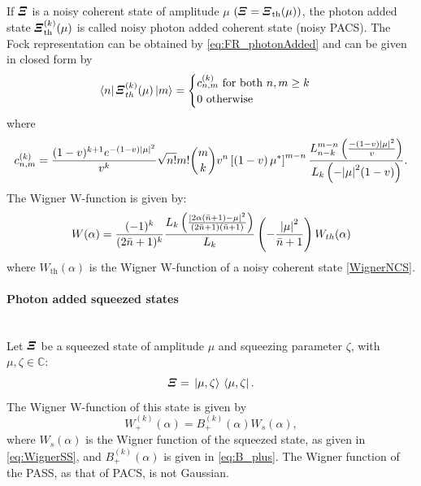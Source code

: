         If $\Operator{\varXi}$ is a noisy coherent state of amplitude $\mu$ 
        $(\Operator{\varXi}=\Operator{\varXi}_{\mathrm{th}}(\mu))$,
        the photon added state $\Operator{\varXi}_{\mathrm{th}}^{(k)}(\mu)$ is called noisy photon added coherent state
        (noisy PACS).
        The Fock representation can be obtained by \ref{eq:FR_photonAdded} and can be given in closed
        form by \cite{PACSDisc}
        \begin{equation}
            \bra{n}\Operator{\varXi}_{th}^{(k)}(\mu)\ket{m}=
            \begin{cases}
                c_{n,m}^{(k)} \mbox{\ for\ both\ } n,m \geq k\\
                0\mbox{\ otherwise}
            \end{cases}
        \end{equation}
        where
        \begin{equation*}
            c_{n,m}^{(k)}=\frac{(1-v)^{k+1}e^{-(1-v)\absolutevalue{\mu}^2}}{v^k}
            \sqrt{n!}{m!}\binom{m}{k} v^n \left[\left(1-v\right)\mu^*\right]^{m-n}
            \frac{L^{m-n}_{n-k} \left( \frac{-(1-v)\absolutevalue{\mu}^2}{v} \right)}
            {L_k \left( -\absolutevalue{\mu}^2 (1-v) \right)}.
        \end{equation*}
        The Wigner W-function is given by:
        \begin{equation}
            W(\alpha)=\frac{(-1)^k}{(2\bar{n}+1)^k}\frac{L_k \left( 
                \frac{\absolutevalue{2\alpha(\bar{n}+1)-\mu}^2}{(2\bar{n}+1)(\bar{n}+1)} \right)}
                {L_k} \left(-\frac{\absolutevalue{\mu}^2}{\bar{n}+1} \right) W_{th}(\alpha)
        \end{equation}
        where $W_{\mathrm{th}}(\alpha)$ is the Wigner W-function of a noisy coherent state \ref{WignerNCS}.
        
        \paragraph{Photon added squeezed states}\mbox{}\\
        Let $\Operator{\varXi}$ be a squeezed state of amplitude $\mu$ and squeezing parameter $\zeta$,
        with $\mu,\zeta \in \mathbb{C}$:
        \begin{equation*}
            \Operator{\varXi}=\ket*{\mu,\zeta}\bra*{\mu,\zeta}.
        \end{equation*}
        The Wigner W-function of this state is given by
        \begin{equation}
            W_+^{(k)}(\alpha) = B_+^{(k)}(\alpha) W_s(\alpha),
        \end{equation}
        where $W_s(\alpha)$ is the Wigner function of the squeezed state, as given in 
        \ref{eq:WignerSS}, and $B_+^{(k)}(\alpha)$ is 
        given in \ref{eq:B_plus}.
        The Wigner function of the PASS, as that of PACS, is not Gaussian.

